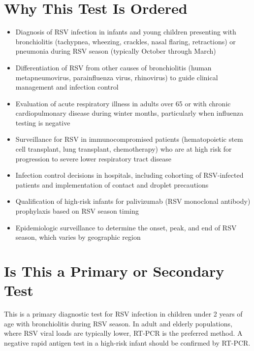 \section*{Why This Test Is Ordered}
\begin{itemize}
  \item Diagnosis of RSV infection in infants and young children presenting with bronchiolitis (tachypnea, wheezing, crackles, nasal flaring, retractions) or pneumonia during RSV season (typically October through March)
  \item Differentiation of RSV from other causes of bronchiolitis (human metapneumovirus, parainfluenza virus, rhinovirus) to guide clinical management and infection control
  \item Evaluation of acute respiratory illness in adults over 65 or with chronic cardiopulmonary disease during winter months, particularly when influenza testing is negative
  \item Surveillance for RSV in immunocompromised patients (hematopoietic stem cell transplant, lung transplant, chemotherapy) who are at high risk for progression to severe lower respiratory tract disease
  \item Infection control decisions in hospitals, including cohorting of RSV-infected patients and implementation of contact and droplet precautions
  \item Qualification of high-risk infants for palivizumab (RSV monoclonal antibody) prophylaxis based on RSV season timing
  \item Epidemiologic surveillance to determine the onset, peak, and end of RSV season, which varies by geographic region
\end{itemize}

\section*{Is This a Primary or Secondary Test}
This is a primary diagnostic test for RSV infection in children under 2 years of age with bronchiolitis during RSV season. In adult and elderly populations, where RSV viral loads are typically lower, RT-PCR is the preferred method. A negative rapid antigen test in a high-risk infant should be confirmed by RT-PCR.

